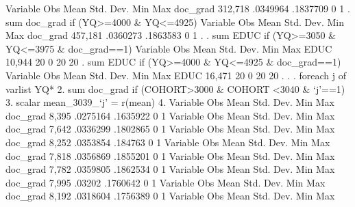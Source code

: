 {\smallskip}
    Variable {\VBAR}        Obs        Mean    Std. Dev.       Min        Max
    doc_grad {\VBAR}    312,718    .0349964    .1837709          0          1
{\smallskip}
. sum doc_grad if (YQ>=4000 \& YQ<=4925)
{\smallskip}
    Variable {\VBAR}        Obs        Mean    Std. Dev.       Min        Max
    doc_grad {\VBAR}    457,181    .0360273    .1863583          0          1
{\smallskip}
. 
. sum EDUC if (YQ>=3050 \& YQ<=3975 \& doc_grad==1)
{\smallskip}
    Variable {\VBAR}        Obs        Mean    Std. Dev.       Min        Max
        EDUC {\VBAR}     10,944          20           0         20         20
{\smallskip}
. sum EDUC if (YQ>=4000 \& YQ<=4925 \& doc_grad==1)
{\smallskip}
    Variable {\VBAR}        Obs        Mean    Std. Dev.       Min        Max
        EDUC {\VBAR}     16,471          20           0         20         20
{\smallskip}
. 
. 
. foreach j of varlist YQ* {\lbr}
  2.                 sum doc_grad if (COHORT>3000 \& COHORT <3040 \& `j'==1)
  3.                 scalar mean_3039_`j' = r(mean)
  4. {\rbr}       
{\smallskip}
    Variable {\VBAR}        Obs        Mean    Std. Dev.       Min        Max
    doc_grad {\VBAR}      8,395    .0275164    .1635922          0          1
{\smallskip}
    Variable {\VBAR}        Obs        Mean    Std. Dev.       Min        Max
    doc_grad {\VBAR}      7,642    .0336299    .1802865          0          1
{\smallskip}
    Variable {\VBAR}        Obs        Mean    Std. Dev.       Min        Max
    doc_grad {\VBAR}      8,252    .0353854     .184763          0          1
{\smallskip}
    Variable {\VBAR}        Obs        Mean    Std. Dev.       Min        Max
    doc_grad {\VBAR}      7,818    .0356869    .1855201          0          1
{\smallskip}
    Variable {\VBAR}        Obs        Mean    Std. Dev.       Min        Max
    doc_grad {\VBAR}      7,782    .0359805    .1862534          0          1
{\smallskip}
    Variable {\VBAR}        Obs        Mean    Std. Dev.       Min        Max
    doc_grad {\VBAR}      7,995      .03202    .1760642          0          1
{\smallskip}
    Variable {\VBAR}        Obs        Mean    Std. Dev.       Min        Max
    doc_grad {\VBAR}      8,192    .0318604    .1756389          0          1
{\smallskip}
    Variable {\VBAR}        Obs        Mean    Std. Dev.       Min        Max
